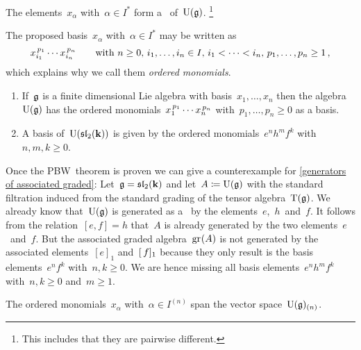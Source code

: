 \begin{theorem}
  \label{pbw concrete}
  The elements~$x_\alpha$ with~$\alpha \in I^*$ form a~{\basis{$\kf$}} of~$\operatorname{U}(\mathfrak{g})$.%
  \footnote{This includes that they are pairwise different.}
\end{theorem}


\begin{remark}
  The proposed basis~$x_\alpha$ with~$\alpha \in I^*$ may be written as
  \[
    x_{i_1}^{\, p_1} \dotsm x_{i_n}^{\, p_n}
    \qquad
    \text{with~$n \geq 0$,~$i_1, \dotsc, i_n \in I$,~$i_1 < \dotsb < i_n$,~$p_1, \dotsc, p_n \geq 1$} \,,
  \]
  which explains why we call them \emph{ordered monomials}.
\end{remark}


\begin{example}
  \leavevmode
  \begin{enumerate}
    \item
      If~$\mathfrak{g}$ is a finite dimensional Lie algebra with basis~$x_1, \dotsc, x_n$ then the algebra~$\operatorname{U}(\mathfrak{g})$ has the ordered monomials~$x_1^{\, p_1} \dotsm x_n^{\, p_n}$ with~$p_1, \dotsc, p_n \geq 0$ as a basis.
    \item
      A basis of~$\operatorname{U}(\mathfrak{sl}_2(\mathbf{k}))$ is given by the ordered monomials~$e^n h^m f^k$ with~$n, m, k \geq 0$.
  \end{enumerate}
\end{example}


\begin{example}
  Once the PBW~theorem is proven we can give a counterexample for \cref{generators of associated graded}:
  Let~$\mathfrak{g} = \mathfrak{sl}_2(\mathbf{k})$ and let~$A \coloneqq \operatorname{U}(\mathfrak{g})$ with the standard filtration induced from the standard grading of the tensor algebra~$\operatorname{T}(\mathfrak{g})$.
  We already know that~$\operatorname{U}(\mathfrak{g})$ is generated as a~{\algebra{$\kf$}} by the elements~$e$,~$h$~and~$f$.
  It follows from the relation~$[e,f] = h$ that~$A$ is already generated by the two elements~$e$~and~$f$.
  But the associated graded algebra~$\gr(A)$ is not generated by the associated elements~$[e]_1$ and~$[\, f]_1$ because they only result is the basis elements~$e^n f^k$ with~$n, k \geq 0$.
  We are hence missing all basis elements~$e^n h^m f^k$ with~$n, k \geq 0$ and~$m \geq 1$.
\end{example}


\begin{lemma}
  \label{pbw concrete generating part filtered part}
  The ordered monomials~$x_\alpha$ with~$\alpha \in I^{(n)}$ span the vector space~$\operatorname{U}(\mathfrak{g})_{(n)}$.
\end{lemma}


